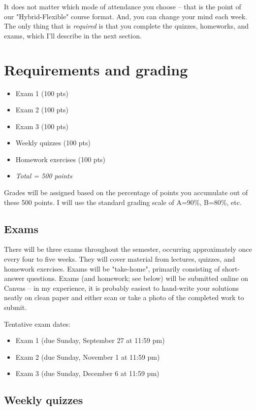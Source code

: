 \documentclass[10pt]{article}
\begin{document}
It does not matter which mode of attendance you choose -- that is the point of our "Hybrid-Flexible" course format. And, you can change your mind each week. The only thing that is \emph{required} is that you complete the quizzes, homeworks, and exams, which I'll describe in the next section.

\section*{Requirements and grading}
\label{sec:org0339e6c}
\begin{itemize}
\item Exam 1 (100 pts)
\item Exam 2 (100 pts)
\item Exam 3 (100 pts)
\item Weekly quizzes (100 pts)
\item Homework exercises (100 pts)
\item \emph{Total = 500 points}
\end{itemize}

Grades will be assigned based on the percentage of points you accumulate out of these 500 points.  I will use the standard grading scale of A=90\%, B=80\%, etc.

\subsection*{Exams}
\label{sec:org16c2163}
There will be three exams throughout the semester, occurring approximately once every four to five weeks.  They will cover material from lectures, quizzes, and homework exercises. Exams will be "take-home", primarily consisting of short-answer questions. Exams (and homework; see below) will be submitted online on Canvas -- in my experience, it is probably easiest to hand-write your solutions neatly on clean paper and either scan or take a photo of the completed work to submit. 

Tentative exam dates:

\begin{itemize}
\item Exam 1 (due Sunday, September 27 at 11:59 pm)
\item Exam 2 (due Sunday, November 1 at 11:59 pm)
\item Exam 3 (due Sunday, December 6 at 11:59 pm)
\end{itemize}

\subsection*{Weekly quizzes}
\label{sec:org6ae36d4}
\end{document}
